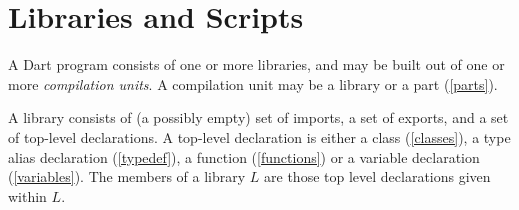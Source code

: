 \documentclass{article}
\begin{document}




\section{Libraries and Scripts}

\LMHash{}
A Dart program consists of one or more libraries, and may be built out of one or more {\em compilation units}. A compilation unit may be a library or a part (\ref{parts}).

\LMHash{}
A library consists of (a possibly empty) set of imports, a set of exports,  and a set of top-level declarations. A top-level declaration is either a class (\ref{classes}), a type alias declaration (\ref{typedef}), a function (\ref{functions}) or a variable declaration (\ref{variables}). The members of a library $L$ are those top level declarations given within $L$.
\end{document}
